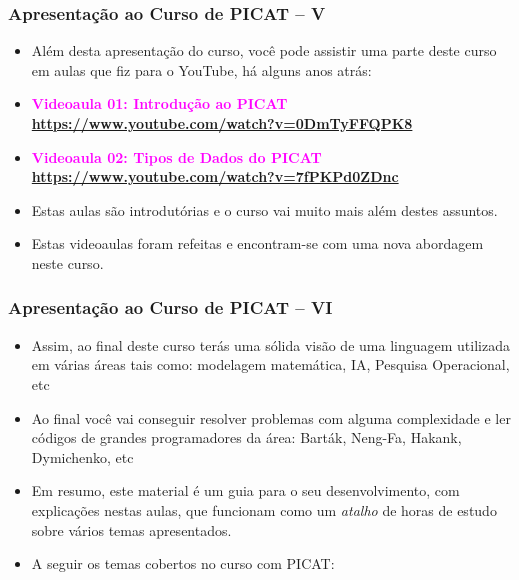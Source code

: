     
\begin{frame}[fragile]
  \frametitle{Apresentação ao Curso de PICAT -- V}
  \begin{itemize}

    \item Além desta  apresentação do curso, você pode assistir uma
    parte deste curso em aulas  que fiz para o YouTube, há alguns anos atrás:

    \pause
    \item \textcolor{magenta}{\textbf{Videoaula 01: Introdução ao PICAT}}\\
    \textbf{\url {https://www.youtube.com/watch?v=0DmTyFFQPK8}}

    \pause 
    \item \textcolor{magenta}{\textbf{Videoaula 02: Tipos de Dados do PICAT}}\\
    \textbf{\url {https://www.youtube.com/watch?v=7fPKPd0ZDnc}} 
    
    \item Estas aulas são introdutórias e o curso vai muito mais além destes
    assuntos.
    
    \pause 
    \item Estas videoaulas foram refeitas e  encontram-se com uma nova abordagem
    neste curso. 
    
  \end{itemize}

\end{frame}




\begin{frame}[fragile]
  \frametitle{Apresentação ao Curso de PICAT -- VI}
  \begin{itemize}

						
    \item Assim, ao final deste curso terás uma sólida visão  de uma linguagem
    utilizada em várias áreas tais como: modelagem matemática, IA,
    Pesquisa Operacional, etc

    \pause
    \item Ao final você vai conseguir resolver problemas com alguma complexidade e ler
    códigos de grandes programadores da área: Barták, Neng-Fa, Hakank, Dymichenko, etc    
    
    \pause
		\item Em resumo, este material é  um guia para o seu desenvolvimento,
		 com explicações nestas aulas, que funcionam como um \textit{atalho} de
		 horas de estudo sobre vários temas apresentados.
   
    \pause
    \item A seguir os temas cobertos no curso com PICAT:
  \end{itemize}

\end{frame}


